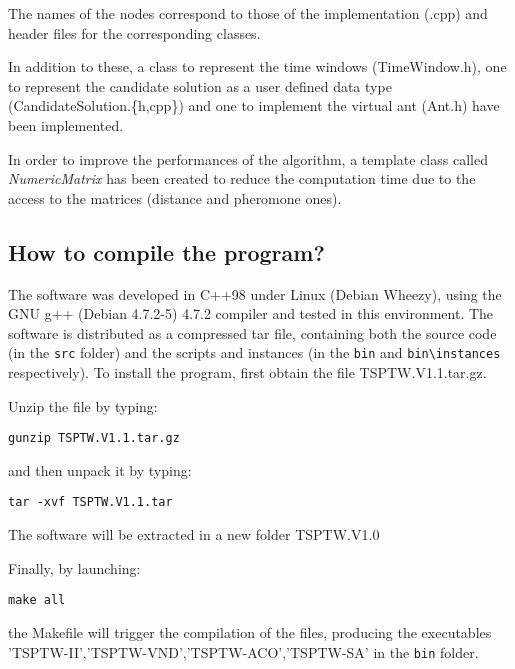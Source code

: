 \documentclass{article}
\begin{document}
The names of the nodes correspond to those of the implementation (.cpp) and header files for the corresponding classes.

In addition to these, a class to represent the time windows (TimeWindow.h), one to represent the candidate solution as
a user defined data type (CandidateSolution.\{h,cpp\}) and one to implement the virtual ant (Ant.h) have been implemented.

In order to improve the performances of the algorithm, a template class called \emph{NumericMatrix} has been created to reduce the computation time due to the access to the matrices (distance and pheromone ones).

\subsection{How to compile the program?}
The software was developed in C++98 under Linux (Debian Wheezy), using the GNU g++ (Debian 4.7.2-5) 4.7.2 compiler and tested in this environment. 
The software is distributed as a compressed tar file, containing both the source code (in the \verb|src| folder) and the scripts and instances (in the \verb|bin| and \verb|bin\instances| respectively).
To install the program, first obtain the file TSPTW.V1.1.tar.gz. 

Unzip the file by typing:

\begin{center}
\begin{verbatim}
gunzip TSPTW.V1.1.tar.gz
\end{verbatim}
\end{center}

and then unpack it by typing:

\begin{center}
\begin{verbatim}
tar -xvf TSPTW.V1.1.tar
\end{verbatim}
\end{center}

The software will be extracted in a new folder TSPTW.V1.0 

Finally, by launching:
\begin{center}
\begin{verbatim}
make all
\end{verbatim}
\end{center}

the Makefile will trigger the compilation of the files,
producing the executables 'TSPTW-II','TSPTW-VND','TSPTW-ACO','TSPTW-SA' in the \verb|bin| folder.
\end{document}
